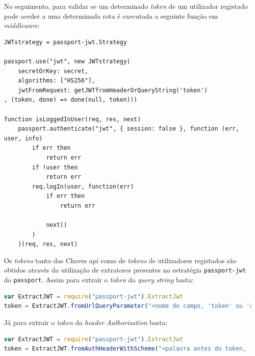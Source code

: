 No seguimento, para validar se um determinado \textit{token} de um utilizador registado pode aceder a uma determinada rota é executada a seguinte função em \textit{middleware}:
\begin{lstlisting}[language=pseudocode, caption=Verificação se um pedido com um determinado \textit{token} de um utilizador registado pode ser efetuado]
JWTstrategy = passport-jwt.Strategy

passport.use("jwt", new JWTstrategy(
    secretOrKey: secret,
    algorithms: ["HS256"],
    jwtFromRequest: getJWTfromHeaderOrQueryString('token')
, (token, done) => done(null, token)))

function isLoggedInUser(req, res, next)
    passport.authenticate("jwt", { session: false }, function (err, user, info)
        if err then
            return err
        if !user then
            return err
        req.logIn(user, function(err)
            if err then
                return err

            next()
        )
    )(req, res, next)
\end{lstlisting}

Os \textit{tokens} tanto das Chaves \acrshort{api} como de \textit{tokens} de utilizadores registados são obtidos através da utilização de extratores presentes na estratégia \texttt{passport-jwt} do \texttt{passport}. Assim para extrair o \textit{token} da \textit{query string} basta:
\begin{lstlisting}[language=javascript, caption=Extração do \textit{token} da \textit{query string}]
var ExtractJWT = require("passport-jwt").ExtractJwt
token = ExtractJWT.fromUrlQueryParameter("<nome do campo, 'token' ou 'apikey' no caso da CLAV>")
\end{lstlisting}
Já para extrair o \textit{token} da \textit{header} \textit{Authorization} basta:
\begin{lstlisting}[language=javascript, caption=Extração do \textit{token} da \textit{heaer} \textit{Authorization}]
var ExtractJWT = require("passport-jwt").ExtractJwt
token = ExtractJWT.fromAuthHeaderWithScheme("<palavra antes do token, 'Bearer' no caso dum bearer token, 'token' ou 'apikey' no caso da CLAV>")
\end{lstlisting}

